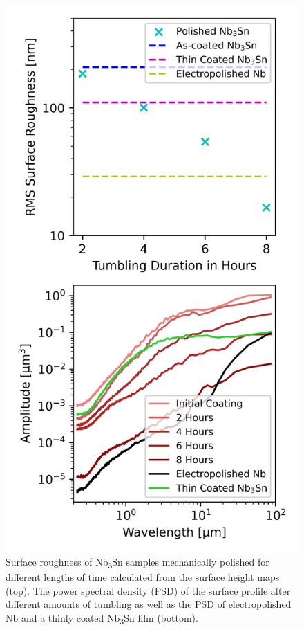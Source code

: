 \documentclass[reprint,amsmath,amssymb,aps]{revtex4-2}%
\begin{document}
\begin{figure}[t]%
\centering%
\includegraphics[width=0.8\columnwidth]{../doc/figs/Surface_Roughness_Graph.png}%
\caption{Surface roughness of Nb\textsubscript{3}Sn samples mechanically polished for different lengths of time calculated from the surface height maps (top). The power spectral density (PSD) of the surface profile after different amounts of tumbling as well as the PSD of electropolished Nb and a thinly coated Nb\textsubscript{3}Sn film (bottom).}%
\label{fig:surfaceroughnessgraph}%
\end{figure}

%
\end{document}
